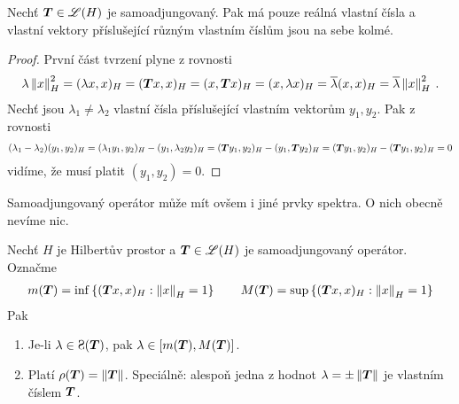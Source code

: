 \begin{lemma}
Nechť $\boldsymbol{T} \in \mathscr{L} (H)$ je samoadjungovaný. Pak má pouze reálná vlastní čísla a vlastní vektory příslušející různým vlastním číslům jsou na sebe kolmé.
\end{lemma}
\begin{proof}
První část tvrzení plyne z rovnosti \begin{align*}
\lambda \left\lVert x\right\rVert^2_H = (\lambda x, x)_H = (\boldsymbol{T} x,x)_H = (x, \boldsymbol{T} x)_H = (x, \lambda x)_H = \overline{\lambda} (x,x)_H = \overline{\lambda} \left\lVert x\right\rVert_H ^2 \:.
\end{align*}
Nechť jsou $\lambda_1 \neq \lambda_2$ vlastní čísla příslušející vlastním vektorům $y_1,y_2$. Pak z rovnosti \begin{align*}
    (\lambda_1 - \lambda_2)(y_1,y_2)_H = (\lambda_1 y_1,y_2)_H - (y_1, \lambda_2 y_2)_H = (\boldsymbol{T} y_1, y_2)_H - (y_1, \boldsymbol{T} y_2)_H = (\boldsymbol{T} y_1,y_2)_H - (\boldsymbol{T} y_1,y_2)_H = 0
\end{align*}
vidíme, že musí platit $(y_1,y_2)=0$.
\end{proof}
\begin{remark}
Samoadjungovaný operátor může mít ovšem i jiné prvky spektra. O nich obecně nevíme nic.
\end{remark}
\begin{theorem} \label{4.Spektralni vlastnosti samoadjug}
Nechť $H$ je Hilbertův prostor a $\boldsymbol{T} \in \mathscr{L} (H)$ je samoadjungovaný operátor. Označme \begin{align*}
    m(\boldsymbol{T}) = \inf \left \lbrace (\boldsymbol{T} x,x)_H : \left\lVert x\right\rVert_H = 1 \right \rbrace \qquad M(\boldsymbol{T}) = \sup \left \lbrace (\boldsymbol{T} x,x)_H : \left\lVert x\right\rVert_H = 1 \right \rbrace
\end{align*} Pak \begin{enumerate}
    \item Je-li $\lambda \in \Sp(\map T)$, pak $\lambda \in [m(\boldsymbol{T}), M(\boldsymbol{T})]$.
    \item Platí $\rho(\boldsymbol{T}) = \left\lVert\boldsymbol{T}\right\rVert$. Speciálně: alespoň jedna z hodnot $\lambda = \pm \left\lVert\boldsymbol{T}\right\rVert$ je vlastním číslem $\boldsymbol{T}$.
\end{enumerate}
\end{theorem} 


